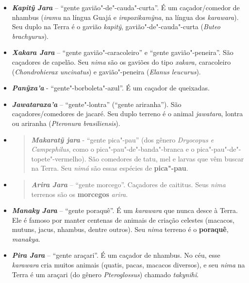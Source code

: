 \begin{itemize}
  \textbf{\emph{Araturaxa'a}} -- ``gente corujinha"-do"-mato''. Seu duplo
  na Terra é a coruja \emph{arakwari'ia}, corujinha"-do"-mato
  (\emph{Megascops choliba}).
\item
  \emph{\textbf{Kapitỹ Jara}} -- ``gente gavião"-de"-cauda"-curta''. É um
  caçador/comedor de nhambus (\emph{iramu} na língua Guajá e
  \emph{irapoxikamỹna}, na língua dos \emph{karawara}). Seu duplo na
  Terra é o gavião \emph{kapitỹ}, gavião"-de"-cauda"-curta (\emph{Buteo
  brachyurus}).
\item
  \emph{\textbf{Xakara Jara}} -- ``gente gavião"-caracoleiro'' e ``gente
  gavião"-peneira''. São caçadores de capelão. Seu \emph{nima} são os
  gaviões do tipo \emph{xakara,} caracoleiro (\emph{Chondrohierax
  uncinatus}) e gavião"-peneira (\emph{Elanus leucurus}).
\item
  \emph{\textbf{Panỹxa'a}} - ``gente"-borboleta"-azul''. É um caçador de
  queixadas.
\item
  \emph{\textbf{Jawataraxa'a}} -- ``gente"-lontra'' (``gente ariranha'').
  São caçadores/comedores de jacaré. Seu duplo terreno é o animal
  \emph{jawatara}, lontra ou ariranha (\emph{Pteronura brasiliensis}).
\item
  \begin{quote}
  \emph{\textbf{Makaratỹ jara}} - ``gente pica"-pau'' (dos gênero
  \emph{Dryocopus e Campephilus}, como o pica"-pau"-de"-banda"-branca e o
  pica"-pau"-de"-topete"-vermelho). São comedores de tatu, mel e larvas que
  vêm buscar na Terra. Seu \emph{nimá} são essas espécies de
  \textbf{pica"-pau}.
  \end{quote}
\item
  \begin{quote}
  \textbf{\emph{Arira} \emph{Jara}} -- ``gente morcego''. Caçadores de
  caititus. Seus \emph{nima} terrenos são os \textbf{morcegos}
  \emph{arira}.
  \end{quote}
\item
  \emph{\textbf{Manaky Jara}} -- ``gente poraquê''. É um \emph{karawara}
  que nunca desce à Terra. Ele é famoso por manter centenas de animais
  de criação celestes (macacos, mutuns, jacus, nhambus, dentre outros).
  Seu \emph{nima} terreno é o \textbf{poraquê}, \emph{manakya}.
\item
  \emph{\textbf{Pira Jara}} -- ``gente araçari''. É um caçador de
  nhambus. No céu, esse \emph{karawara} cria muitos animais (quatis,
  pacas, macacos diversos), e seu \emph{nima} na Terra é um araçari (do
  gênero \emph{Pteroglossus}) chamado \emph{takynihĩ}.

\end{itemize}
